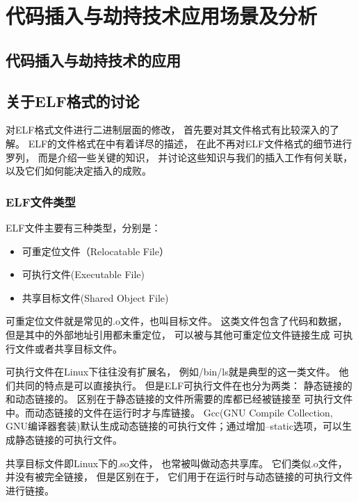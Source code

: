 \chapter{代码插入与劫持技术应用场景及分析}




\section{代码插入与劫持技术的应用}




\section{关于ELF格式的讨论}

对ELF格式文件进行二进制层面的修改，
首先要对其文件格式有比较深入的了解。
ELF的文件格式在\cite{elf1.2}中有着详尽的描述，
在此不再对ELF文件格式的细节进行罗列，
而是介绍一些关键的知识，
并讨论这些知识与我们的插入工作有何关联，
以及它们如何能决定插入的成败。

  \subsection{ELF文件类型} 

ELF文件主要有三种类型，分别是：

\begin{itemize}
 \item 可重定位文件（Relocatable File）
 \item 可执行文件(Executable File)
 \item 共享目标文件(Shared Object File)
\end{itemize}

可重定位文件就是常见的.o文件，也叫目标文件。
这类文件包含了代码和数据，
但是其中的外部地址引用都未重定位，
可以被与其他可重定位文件链接生成
可执行文件或者共享目标文件。

可执行文件在Linux下往往没有扩展名，
例如/bin/ls就是典型的这一类文件。
他们共同的特点是可以直接执行。
但是ELF可执行文件在也分为两类：
静态链接的和动态链接的。
区别在于静态链接的文件所需要的库都已经被链接至
可执行文件中。而动态链接的文件在运行时才与库链接。
Gcc(GNU Compile Collection, GNU编译器套装)默认生成动态链接的可执行文件；通过增加--static选项，可以生成静态链接的可执行文件。

共享目标文件即Linux下的.so文件，
也常被叫做动态共享库。
它们类似.o文件，并没有被完全链接，
但是区别在于，
它们用于在运行时与动态链接的可执行文件进行链接。

